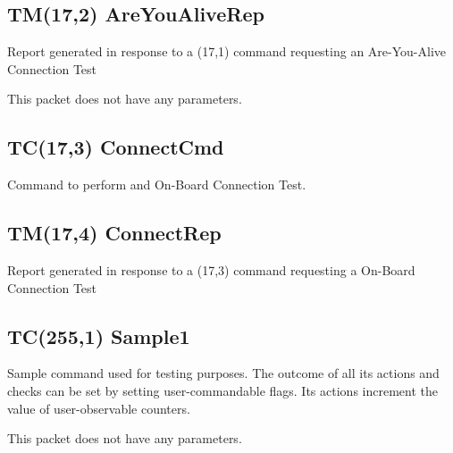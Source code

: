 \pagebreak
\subsection{TM(17,2) AreYouAliveRep}
Report generated in response to a (17,1) command requesting an Are-You-Alive Connection Test

This packet does not have any parameters.

\pagebreak
\subsection{TC(17,3) ConnectCmd}
Command to perform and On-Board Connection Test. 

\pagebreak
\subsection{TM(17,4) ConnectRep}
Report generated in response to a (17,3) command requesting a On-Board Connection Test

\pagebreak
\subsection{TC(255,1) Sample1}
Sample command used for testing purposes. The outcome of all its actions and checks can be set by setting user-commandable flags. Its actions increment the value of user-observable counters. 

This packet does not have any parameters.

